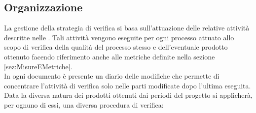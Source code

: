 \documentclass[../PianoDiQualifica.tex]{subfiles}
\begin{document}
		\subsection{Organizzazione}
			La gestione della strategia di verifica si basa sull'attuazione delle
			relative attività descritte nelle \normediprogettov. Tali attività vengono
			eseguite per ogni processo attuato allo scopo di verifica della qualità del
			processo stesso e dell'eventuale prodotto ottenuto facendo riferimento
			anche alle metriche definite nella sezione \ref{sez:MisureEMetriche}.\\
			In ogni documento è presente un diario delle modifiche che permette di concentrare
			l'attività di verifica solo nelle parti modificate dopo l'ultima eseguita.\\
			Data la diversa natura dei prodotti ottenuti dai periodi del progetto si
			applicherà, per ognuno di essi, una diversa procedura di verifica:
\end{document}
